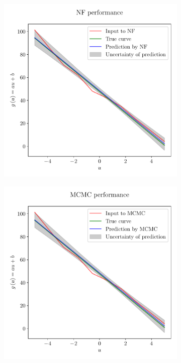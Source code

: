 \documentclass[a4paper,11pt]{report}
\begin{document}
\begin{figure}[h!]
	\centering
	\begin{subfigure}[t]{0.49\textwidth}
	\centering
	\includegraphics[width=\textwidth]{figures/nf-linear-regression-example-nfperformance.pdf}
	\end{subfigure}
	\hfill
	\begin{subfigure}[t]{0.49\textwidth}
	\centering
	\includegraphics[width=\textwidth]{figures/nf-linear-regression-example-mcmcperformance.pdf}

\end{subfigure}
\end{figure}
\end{document}
